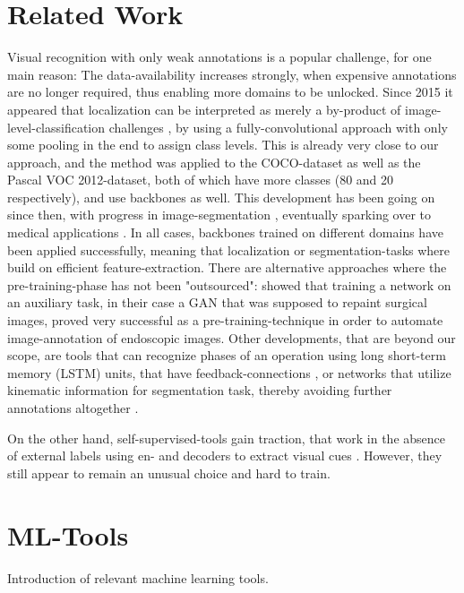 \section{Related Work}
Visual recognition with only weak annotations is a popular challenge, for one main reason: The data-availability increases strongly, when expensive annotations are no longer required, thus enabling more domains to be unlocked. Since 2015 it appeared that localization can be interpreted as merely a by-product of image-level-classification challenges \citep{Localization_free}, by using a fully-convolutional approach with only some pooling in the end to assign class levels. This is already very close to our approach, and the method was applied to the COCO-dataset as well as the Pascal VOC 2012-dataset, both of which have more classes (80 and 20 respectively), and use backbones as well. This development has been going on since then, with progress in image-segmentation \citep{classpeak}, eventually sparking over to medical applications \citep{Vardazaryan}. 
In all cases, backbones trained on different domains have been applied successfully, meaning that localization or segmentation-tasks where build on efficient feature-extraction. There are alternative approaches where the pre-training-phase has not been "outsourced": \cite{ross2018exploiting} showed that training a network on an auxiliary task, in their case a GAN that was supposed to repaint surgical images, proved very successful as a pre-training-technique in order to automate image-annotation of endoscopic images.
Other developments, that are beyond our scope, are tools that can recognize phases of an operation using long short-term memory (LSTM) units, that have feedback-connections \cite{lstm}, or networks that utilize kinematic information for segmentation task, thereby avoiding further annotations altogether \cite{da2019self}.

On the other hand, self-supervised-tools gain traction, that work in the absence of external labels using en- and decoders to extract visual cues \cite{VAE_discussion}. However, they still appear to remain an unusual choice and hard to train.

\section{ML-Tools}
Introduction of relevant machine learning tools.

